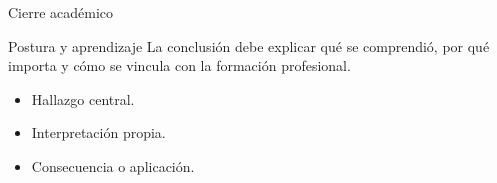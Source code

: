 ﻿\documentclass[spanish,aspectratio=169]{beamer}
\begin{document}
\begin{frame}{Cierre académico}
  \begin{block}{Postura y aprendizaje}
    La conclusión debe explicar qué se comprendió, por qué importa y cómo se vincula con la formación profesional.
  \end{block}
  \begin{itemize}
    \item Hallazgo central.
    \item Interpretación propia.
    \item Consecuencia o aplicación.
  \end{itemize}
\end{frame}
\end{document}
